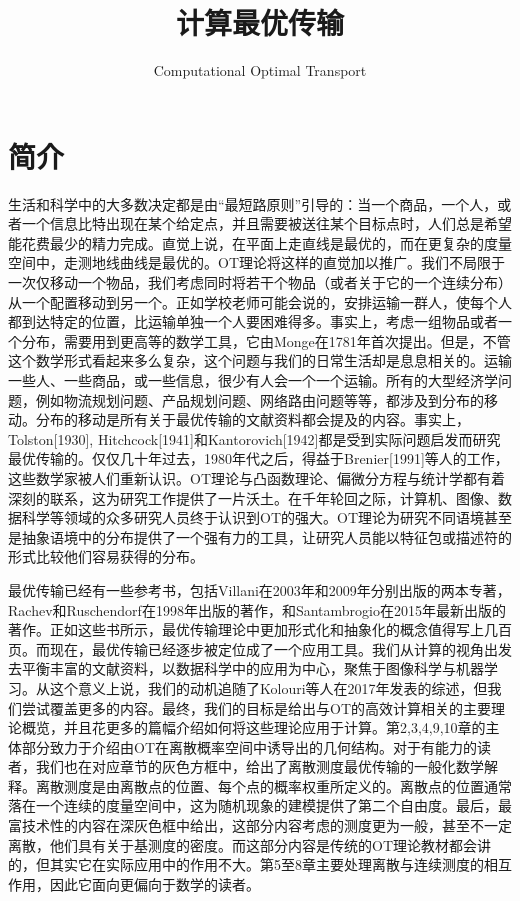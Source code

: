 \documentclass[cn,10pt,math=newtx,citestyle=gb7714-2015,bibstyle=gb7714-2015]{elegantbook}
\title{ 计算最优传输 }
\subtitle{ Computational Optimal Transport }
\begin{document}
\maketitle
\frontmatter

\tableofcontents

\mainmatter

\chapter{简介}

生活和科学中的大多数决定都是由“最短路原则”引导的：当一个商品，一个人，或者一个信息比特出现在某个给定点，并且需要被送往某个目标点时，人们总是希望能花费最少的精力完成。直觉上说，在平面上走直线是最优的，而在更复杂的度量空间中，走测地线曲线是最优的。OT理论将这样的直觉加以推广。我们不局限于一次仅移动一个物品，我们考虑同时将若干个物品（或者关于它的一个连续分布）从一个配置移动到另一个。正如学校老师可能会说的，安排运输一群人，使每个人都到达特定的位置，比运输单独一个人要困难得多。事实上，考虑一组物品或者一个分布，需要用到更高等的数学工具，它由Monge在1781年首次提出。但是，不管这个数学形式看起来多么复杂，这个问题与我们的日常生活却是息息相关的。运输一些人、一些商品，或一些信息，很少有人会一个一个运输。所有的大型经济学问题，例如物流规划问题、产品规划问题、网络路由问题等等，都涉及到分布的移动。分布的移动是所有关于最优传输的文献资料都会提及的内容。事实上，Tolston[1930], Hitchcock[1941]和Kantorovich[1942]都是受到实际问题启发而研究最优传输的。仅仅几十年过去，1980年代之后，得益于Brenier[1991]等人的工作，这些数学家被人们重新认识。OT理论与凸函数理论、偏微分方程与统计学都有着深刻的联系，这为研究工作提供了一片沃土。在千年轮回之际，计算机、图像、数据科学等领域的众多研究人员终于认识到OT的强大。OT理论为研究不同语境甚至是抽象语境中的分布提供了一个强有力的工具，让研究人员能以特征包或描述符的形式比较他们容易获得的分布。

最优传输已经有一些参考书，包括Villani在2003年和2009年分别出版的两本专著，Rachev和Ruschendorf在1998年出版的著作，和Santambrogio在2015年最新出版的著作。正如这些书所示，最优传输理论中更加形式化和抽象化的概念值得写上几百页。而现在，最优传输已经逐步被定位成了一个应用工具。我们从计算的视角出发去平衡丰富的文献资料，以数据科学中的应用为中心，聚焦于图像科学与机器学习。从这个意义上说，我们的动机追随了Kolouri等人在2017年发表的综述，但我们尝试覆盖更多的内容。最终，我们的目标是给出与OT的高效计算相关的主要理论概览，并且花更多的篇幅介绍如何将这些理论应用于计算。第2,3,4,9,10章的主体部分致力于介绍由OT在离散概率空间中诱导出的几何结构。对于有能力的读者，我们也在对应章节的灰色方框中，给出了离散测度最优传输的一般化数学解释。离散测度是由离散点的位置、每个点的概率权重所定义的。离散点的位置通常落在一个连续的度量空间中，这为随机现象的建模提供了第二个自由度。最后，最富技术性的内容在深灰色框中给出，这部分内容考虑的测度更为一般，甚至不一定离散，他们具有关于基测度的密度。而这部分内容是传统的OT理论教材都会讲的，但其实它在实际应用中的作用不大。第5至8章主要处理离散与连续测度的相互作用，因此它面向更偏向于数学的读者。
\end{document}
